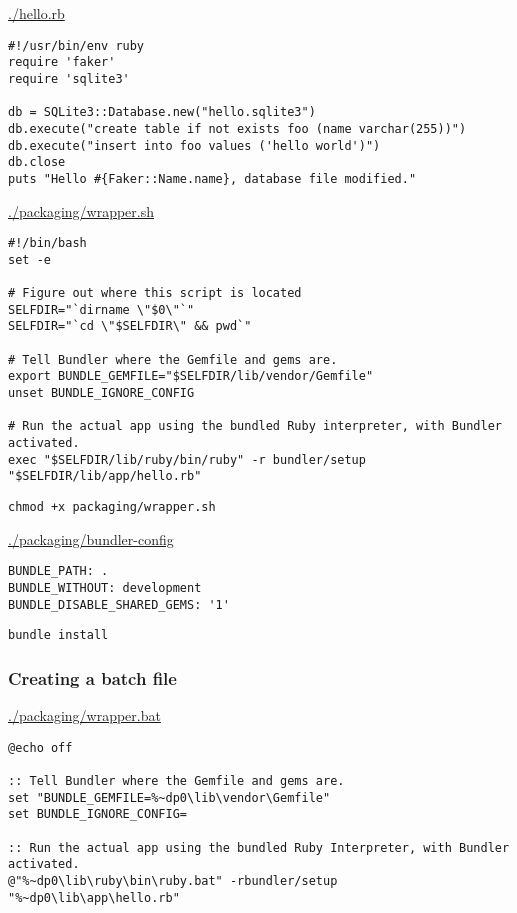 \documentclass[11pt]{article}
\begin{document}
\url{./hello.rb}

\begin{verbatim}
#!/usr/bin/env ruby
require 'faker'
require 'sqlite3'

db = SQLite3::Database.new("hello.sqlite3")
db.execute("create table if not exists foo (name varchar(255))")
db.execute("insert into foo values ('hello world')")
db.close
puts "Hello #{Faker::Name.name}, database file modified."
\end{verbatim}

\url{./packaging/wrapper.sh}

\begin{verbatim}
#!/bin/bash
set -e

# Figure out where this script is located
SELFDIR="`dirname \"$0\"`"
SELFDIR="`cd \"$SELFDIR\" && pwd`"

# Tell Bundler where the Gemfile and gems are.
export BUNDLE_GEMFILE="$SELFDIR/lib/vendor/Gemfile"
unset BUNDLE_IGNORE_CONFIG

# Run the actual app using the bundled Ruby interpreter, with Bundler activated.
exec "$SELFDIR/lib/ruby/bin/ruby" -r bundler/setup "$SELFDIR/lib/app/hello.rb"
\end{verbatim}

\begin{verbatim}
chmod +x packaging/wrapper.sh
\end{verbatim}

\url{./packaging/bundler-config}

\begin{verbatim}
BUNDLE_PATH: .
BUNDLE_WITHOUT: development
BUNDLE_DISABLE_SHARED_GEMS: '1'
\end{verbatim}

\begin{verbatim}
bundle install
\end{verbatim}

\subsubsection{Creating a batch file}
\label{sec-2-1-2}

\url{./packaging/wrapper.bat}

\begin{verbatim}
@echo off

:: Tell Bundler where the Gemfile and gems are.
set "BUNDLE_GEMFILE=%~dp0\lib\vendor\Gemfile"
set BUNDLE_IGNORE_CONFIG=

:: Run the actual app using the bundled Ruby Interpreter, with Bundler activated.
@"%~dp0\lib\ruby\bin\ruby.bat" -rbundler/setup "%~dp0\lib\app\hello.rb"
\end{verbatim}
\end{document}
